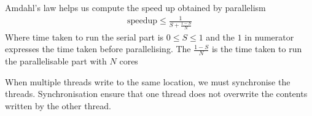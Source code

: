 \documentclass[a4paper]{article}
\theoremstyle{plain}
\newtheorem{thm}{Theorem}[section]
\theoremstyle{definition}
\newtheorem{defn}{Definition}[section]
\theoremstyle{remark}
\begin{document}
\begin{tcolorbox}[colback=black!3!white,colframe=black!60!white,title=\begin{thm}Amdahl's Law \label{Amdahl's Law}\end{thm}]
	Amdahl's law helps us compute the speed up obtained by parallelism
		\begin{align}	
		\text{speedup}\le \frac{1}{S+\frac{1-S}{N}}
		\end{align}
Where time taken to run the serial part is $0\le S\le 1$ and the $1$ in numerator expresses the time taken before parallelising. The $\frac{1-S}{N}$ is the time taken to run the parallelisable part with $N$ cores
\end{tcolorbox}
\begin{tcolorbox}[colback=black!3!white,colframe=black!60!white,title=\begin{defn}Thread Synchronosation \label{Thread Synchronosation}\end{defn}]
When multiple threads write to the same location, we must synchronise the threads. Synchronisation ensure that one thread does not overwrite the contents written by the other thread.
\end{tcolorbox}
\end{document}
